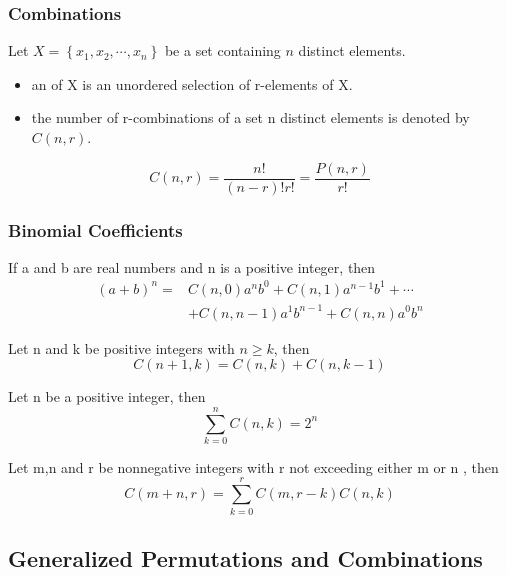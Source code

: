 \subsubsection{Combinations}
\begin{definition}
    Let $X=\left\{ x_1,x_2,\cdots, x_n \right\}$ be a set containing $n$ distinct elements. 
    \begin{itemize}
        \item an  of X is an unordered selection of r-elements of X.
        \item the number of r-combinations of a set n distinct elements is denoted by $C(n,r)$.
    \end{itemize}
\end{definition}
\begin{theorem}
    \[ C(n,r)=\frac{n!}{(n-r)!r!}=\frac{P(n,r)}{r!} \]
\end{theorem}

\subsubsection{Binomial Coefficients}

\begin{theorem}
    If a and b are real numbers and n is a positive integer, then 
    \begin{align*}
        (a+b)^n=&C(n,0)a^n b^0 + C(n,1)a^{n-1} b^1 + \cdots \\
        &+C(n,n-1)a^1 b^{n-1} + C(n,n)a^0 b^n
    \end{align*}
\end{theorem}

\begin{theorem}
    Let n and k be positive integers with $n\ge k $, then
    \[ C(n+1,k)=C(n,k)+C(n,k-1) \]
\end{theorem}

\begin{theorem}
    Let n be a positive integer, then
    \[ \sum_{k=0}^n C(n,k)=2^n \]
\end{theorem}

\begin{theorem}
    Let m,n and r be nonnegative integers with r not exceeding either m or n , then
    \[ C(m+n,r)=\sum_{k=0}^r C(m,r-k)C(n,k) \]
\end{theorem}

\subsection{Generalized Permutations and Combinations}

